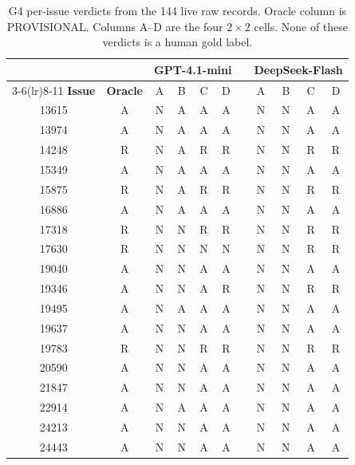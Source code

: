 \begin{table}[h]
\centering
\scriptsize
\setlength{\tabcolsep}{4pt}
\caption{G4 per-issue verdicts from the 144 live raw records. Oracle column
is PROVISIONAL. Columns A--D are the four $2\times2$ cells. None of these
verdicts is a human gold label.}
\label{tab:g4grid}
\begin{tabular}{c c cccc c cccc}
\toprule
 & & \multicolumn{4}{c}{\textbf{GPT-4.1-mini}} & & \multicolumn{4}{c}{\textbf{DeepSeek-Flash}} \\
\cmidrule(lr){3-6}\cmidrule(lr){8-11}
\textbf{Issue} & \textbf{Oracle} & A & B & C & D & & A & B & C & D \\
\midrule
13615 & A & N & A & A & A && N & N & A & A \\
13974 & A & N & A & A & A && N & N & A & A \\
14248 & R & N & A & R & R && N & N & R & R \\
15349 & A & N & A & A & A && N & N & A & A \\
15875 & R & N & A & R & R && N & N & R & R \\
16886 & A & N & A & A & A && N & N & A & A \\
17318 & R & N & N & R & R && N & N & R & R \\
17630 & R & N & N & N & N && N & N & R & R \\
19040 & A & N & N & A & A && N & N & A & A \\
19346 & A & N & N & A & R && N & N & R & R \\
19495 & A & N & A & A & A && N & N & A & A \\
19637 & A & N & N & A & A && N & N & A & A \\
19783 & R & N & N & R & R && N & N & R & R \\
20590 & A & N & N & A & A && N & N & A & A \\
21847 & A & N & N & A & A && N & N & A & A \\
22914 & A & N & A & A & A && N & N & A & A \\
24213 & A & N & N & A & A && N & N & A & A \\
24443 & A & N & N & A & A && N & N & A & A \\
\bottomrule
\end{tabular}
\end{table}

